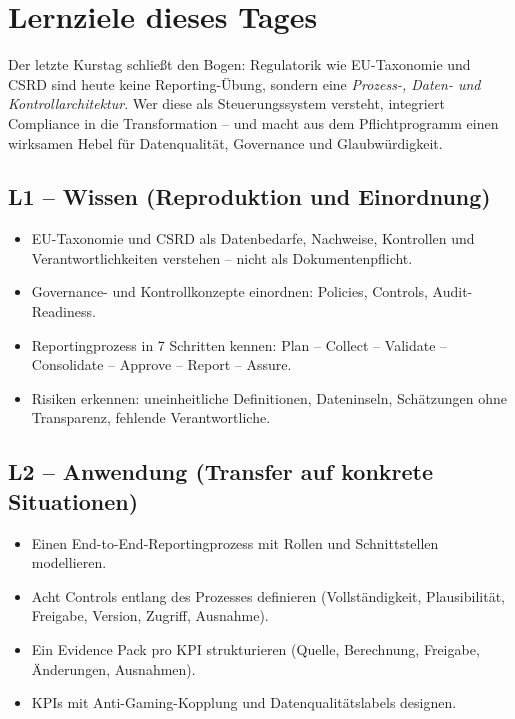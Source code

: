 \documentclass[11pt,a4paper,oneside]{article}
\begin{document}
\section*{Lernziele dieses Tages}
\thispagestyle{plain}

\noindent Der letzte Kurstag schließt den Bogen: Regulatorik wie EU-Taxonomie und CSRD sind heute keine Reporting-Übung, sondern eine \emph{Prozess-, Daten- und Kontrollarchitektur}. Wer diese als Steuerungssystem versteht, integriert Compliance in die Transformation -- und macht aus dem Pflichtprogramm einen wirksamen Hebel für Datenqualität, Governance und Glaubwürdigkeit.

\subsection*{L1 -- Wissen (Reproduktion und Einordnung)}
\begin{itemize}
  \item EU-Taxonomie und CSRD als Datenbedarfe, Nachweise, Kontrollen und Verantwortlichkeiten verstehen -- nicht als Dokumentenpflicht.
  \item Governance- und Kontrollkonzepte einordnen: Policies, Controls, Audit-Readiness.
  \item Reportingprozess in 7 Schritten kennen: Plan -- Collect -- Validate -- Consolidate -- Approve -- Report -- Assure.
  \item Risiken erkennen: uneinheitliche Definitionen, Dateninseln, Schätzungen ohne Transparenz, fehlende Verantwortliche.
\end{itemize}

\subsection*{L2 -- Anwendung (Transfer auf konkrete Situationen)}
\begin{itemize}
  \item Einen End-to-End-Reportingprozess mit Rollen und Schnittstellen modellieren.
  \item Acht Controls entlang des Prozesses definieren (Vollständigkeit, Plausibilität, Freigabe, Version, Zugriff, Ausnahme).
  \item Ein Evidence Pack pro KPI strukturieren (Quelle, Berechnung, Freigabe, Änderungen, Ausnahmen).
  \item KPIs mit Anti-Gaming-Kopplung und Datenqualitätslabels designen.
\end{itemize}
\end{document}
